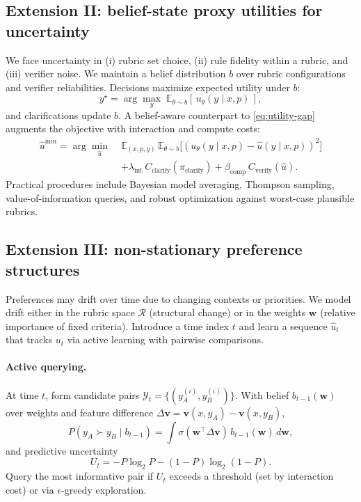 \documentclass[sigconf]{acmart}
\begin{document}
\subsection{Extension II: belief-state proxy utilities for uncertainty}\label{sec:belief}

We face uncertainty in (i) rubric set choice, (ii) rule fidelity within a rubric, and (iii) verifier noise. We maintain a belief distribution \(b\) over rubric configurations and verifier reliabilities. Decisions maximize expected utility under \(b\):
\[
y^\star=\arg\max_y \;\mathbb{E}_{\theta\sim b}[\,u_\theta(y\mid x,p)\,],
\]
and clarifications update \(b\). A belief-aware counterpart to \eqref{eq:utility-gap} augments the objective with interaction and compute costs:
\begin{equation}
\begin{aligned}
\hat u^{\min} = \arg\min_{\hat u}\;&
\mathbb{E}_{(x,p,y)}\,\mathbb{E}_{\theta \sim b}
\Big[(u_\theta(y \mid x,p) - \hat u(y \mid x,p))^2\Big] \\
&+ \lambda_{\mathrm{int}}\, C_{\text{clarify}}(\pi_{\text{clarify}})
+ \beta_{\mathrm{comp}}\, C_{\text{verify}}(\hat u).
\end{aligned}
\end{equation}
Practical procedures include Bayesian model averaging, Thompson sampling, value-of-information queries, and robust optimization against worst-case plausible rubrics.

\subsection{Extension III: non-stationary preference structures}\label{sec:drift}

Preferences may drift over time due to changing contexts or priorities. We model drift either in the rubric space \(\mathcal{R}\) (structural change) or in the weights \(\mathbf{w}\) (relative importance of fixed criteria). Introduce a time index \(t\) and learn a sequence \(\hat u_t\) that tracks \(u_t\) via active learning with pairwise comparisons.

\paragraph{Active querying.}
At time \(t\), form candidate pairs \(\mathcal{Y}_t=\{(y_A^{(i)},y_B^{(i)})\}\). With belief \(b_{t-1}(\mathbf{w})\) over weights and feature difference \(\Delta\mathbf{v}=\mathbf{v}(x,y_A)-\mathbf{v}(x,y_B)\),
\[
P(y_A\succ y_B\mid b_{t-1})=\int \sigma(\mathbf{w}^\top \Delta\mathbf{v})\,b_{t-1}(\mathbf{w})\,d\mathbf{w},
\]
and predictive uncertainty
\[
U_t=-P\log_2 P-(1-P)\log_2(1-P).
\]
Query the most informative pair if \(U_t\) exceeds a threshold (set by interaction cost) or via \(\epsilon\)-greedy exploration.
\end{document}
